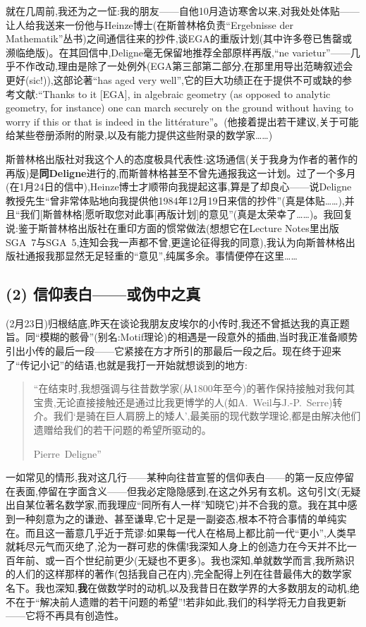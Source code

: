 就在几周前,我还为之一怔:我的朋友——自他10月造访寒舍以来,对我处处体贴——让人给我送来一份他与Heinze博士(在斯普林格负责“Ergebnisse der Mathematik”丛书)之间通信往来的抄件,谈EGA的重版计划(其中许多卷已售罄或濒临绝版)。在其回信中,Deligne毫无保留地推荐全部原样再版,“ne varietur”——几乎不作改动,理由是除了一处例外(EGA第三部第二部分,在那里用导出范畴叙述会更好(sic!)),这部论著“has aged very well”,它的巨大功绩正在于提供不可或缺的参考文献:“Thanks to it [EGA], in algebraic geometry (as opposed to analytic geometry, for instance) one can march securely on the ground without having to worry if this or that is indeed in the littérature”。(他接着提出若干建议,关于可能给某些卷册添附的附录,以及有能力提供这些附录的数学家……)

斯普林格出版社对我这个人的态度极具代表性:这场通信(关于我身为作者的著作的再版)是\textbf{同Deligne}进行的,而斯普林格甚至不曾先通报我这一计划。过了一个多月(在1月24日的信中),Heinze博士才顺带向我提起这事,算是了却良心——说Deligne教授先生“曾非常体贴地向我提供他1984年12月19日来信的抄件”(真是体贴……),并且“我们[斯普林格]愿听取您对此事[再版计划]的意见”(真是太荣幸了……)。我回复说:鉴于斯普林格出版社在重印方面的惯常做法(想想它在Lecture Notes里出版SGA~7与SGA~5,连知会我一声都不曾,更遑论征得我的同意),我认为向斯普林格出版社通报我那显然无足轻重的“意见”,纯属多余。事情便停在这里……

\subsection{(2) 信仰表白——或伪中之真}


(2月23日)归根结底,昨天在谈论我朋友皮埃尔的小传时,我还不曾抵达我的真正题旨。同“模糊的骸骨”(别名:Motif理论)的相遇是一段意外的插曲,当时我正准备顺势引出小传的最后一段——它紧接在方才所引的那最后一段之后\dmark{}。现在终于迎来了“传记小记”的结语,也就是我打一开始就想谈到的地方:

\begin{quote}
“在结束时,我想强调与往昔数学家(从1800年至今)的著作保持接触对我何其宝贵,无论直接接触还是通过比我更博学的人(如A.~Weil与J.-P.~Serre)转介。我们‘是骑在巨人肩膀上的矮人’,最美丽的现代数学理论,都是由解决他们遗赠给我们的若干问题的希望所驱动的。

Pierre~Deligne”
\end{quote}

一如常见的情形,我对这几行——某种向往昔宣誓的信仰表白——的第一反应停留在表面,停留在字面含义——但我必定隐隐感到,在这之外另有玄机。这句引文(无疑出自某位著名数学家,而我理应“同所有人一样”知晓它)并不合我的意。我在其中感到一种刻意为之的谦逊、甚至谦卑,它十足是一副姿态,根本不符合事情的单纯实在。而且这一蓄意几乎近于荒谬:如果每一代人在格局上都比前一代“更小”,人类早就耗尽元气而灭绝了,沦为一群可悲的侏儒!我深知人身上的创造力在今天并不比一百年前、或一百个世纪前更少(无疑也不更多)。我也深知,单就数学而言,我所熟识的人们的这样那样的著作(包括我自己在内),完全配得上列在往昔最伟大的数学家名下。我也深知,\textbf{我}在做数学时的动机,以及我昔日在数学界的大多数朋友的动机,绝不在于“解决前人遗赠的若干问题的希望”!若非如此,我们的科学将无力自我更新——它将不再具有创造性。

